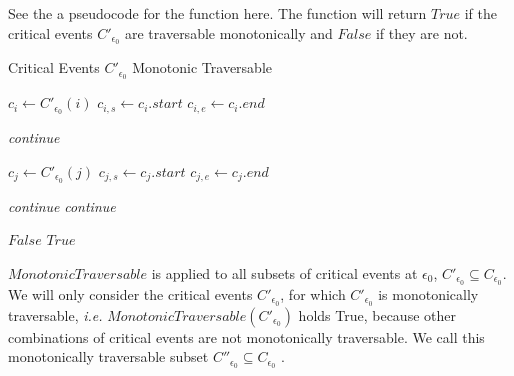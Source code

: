 See the a pseudocode for the function here. The function will return $True$ if the critical events $C'_{\epsilon_0}$ are traversable monotonically and $False$ if they are not.
\begin{algorithm}[H]
\caption{Critical Events $C'_{\epsilon_0}$ Monotonic Traversable}\label{euclid}
\begin{algorithmic}[1]

	\State {}
	\State {}
\EndFunction

\State {}

	\State {}
	
		\State $c_{i} \gets C'_{\epsilon_0}(i)$
		\State $c_{i,s} \gets c_{i}.start$
		\State $c_{i,e} \gets c_{i}.end$
		\State {}
	
				\textit{continue}
				 \EndIf
			\State {}
			
			\State $c_{j} \gets C'_{\epsilon_0}(j)$
			\State $c_{j,s} \gets c_{j}.start$
			\State $c_{j,e} \gets c_{j}.end$
			\State {}
			
				\State \textit{continue}
			\EndIf
				\State \textit{continue}
			\EndIf
			\State {}
				
			\State \Return $False$ 
		\EndFor
	\EndFor
	\State \Return $True$ 
\EndFunction
\end{algorithmic}
\end{algorithm}

$MonotonicTraversable$ is applied to all subsets of critical events at $\epsilon_0$, $C'_{\epsilon_0} \subseteq C_{\epsilon_0}$. We will only consider the critical events $C'_{\epsilon_0}$, for which $C'_{\epsilon_0}$ is monotonically traversable, \textit{i.e.} $MonotonicTraversable(C'_{\epsilon_0})$ holds True, because other combinations of critical events are not monotonically traversable. We call this monotonically traversable subset $C''_{\epsilon_0} \subseteq C_{\epsilon_0}$ .

